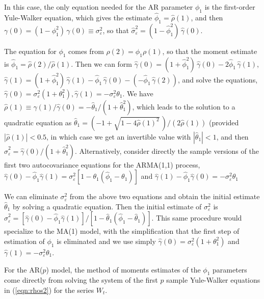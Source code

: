 \begin{ex}[AR(1) Model]
 In this case, the only equation needed for the AR parameter $\phi_1$ is the first-order Yule-Walker equation, which gives the estimate $\hat{\phi}_1 = \hat{\rho}(1)$, and then $\gamma(0) = (1- \phi_1^2)\,\gamma(0) \equiv \sigma_{\varepsilon}^2$, so that $\hat{\sigma}_{\varepsilon}^2 = (1 - \hat{\phi}_1^2)\,\hat{\gamma}(0)$.
 \end{ex}


\begin{ex}
 The equation for $\phi_1$ comes from $\rho(2) = \phi_1 \rho(1)$, so that the moment estimate is $\hat{\phi}_1 = \hat{\rho}(2) / \hat{\rho}(1)$. Then we can form $\hat{\gamma}(0) = (1+\hat{\phi}_1^2)\,\hat{\gamma}(0) - 2\hat{\phi}_1\,\hat{\gamma}(1)$, $\hat{\gamma}(1) = (1+\hat{\phi}_1^2)\,\hat{\gamma}(1) - \hat{\phi}_1\,\hat{\gamma}(0) - (- \hat{\phi}_1\,\hat{\gamma}(2))$, and solve the equations, $\hat{\gamma}(0) = \sigma_{\varepsilon}^2(1 + \theta_1^2), \hat{\gamma}(1) = -\sigma_{\varepsilon}^2\theta_1$. We have $\hat{\rho}(1) \equiv \hat{\gamma}(1)/\hat{\gamma}(0) = -\hat{\theta}_1/(1 + \hat{\theta}_1^2)$, which leads to the solution to a quadratic equation as $\hat{\theta}_1 = (-1 + \sqrt{1-4\hat{\rho}(1)^2}\,) / (2\hat{\rho}(1))$ (provided $|\hat{\rho}(1)| < 0.5$, in which case we get an invertible value with $|\hat{\theta}_1| < 1$, and then $\hat{\sigma}_{\varepsilon}^2 = \hat{\gamma}(0)/(1+\hat{\theta}_1^2)$. Alternatively, consider directly the sample versions of the first two autocovariance equations for the ARMA(1,1) process, $\hat{\gamma}(0) - \hat{\phi}_1\hat{\gamma}(1) = \sigma_{\varepsilon}^2[1 - \theta_1(\hat{\phi}_1 - \theta_1)]$ and $\hat{\gamma}(1) - \hat{\phi}_1\hat{\gamma}(0) = -\sigma_{\varepsilon}^2\theta_1$

We can eliminate $\sigma_{\varepsilon}^2$ from the above two equations and obtain the initial estimate $\hat{\theta}_1$ by solving a quadratic equation. Then the initial estimate of $\sigma_{\varepsilon}^2$ is $\hat{\sigma}_{\varepsilon}^2 = [\hat{\gamma}(0) - \hat{\phi}_1\hat{\gamma}(1)]/[1 - \hat{\theta}_1(\hat{\phi}_1 - \hat{\theta}_1)]$. This same procedure would specialize to the MA(1) model, with the simplification that the first step of estimation of $\phi_1$ is eliminated and we use simply $\hat{\gamma}(0) = \sigma_{\varepsilon}^2(1 + \theta_1^2)$ and $\hat{\gamma}(1) = -\sigma_{\varepsilon}^2\theta_1$.
 \end{ex}


\begin{ex}[AR($p$) Model]
 For the AR($p$) model, the method of moments estimates of the $\phi_1$ parameters come directly from solving the system of the first $p$ sample Yule-Walker equations in (\ref{eqn:rhos2}) for the series $W_t$.
\end{ex}


